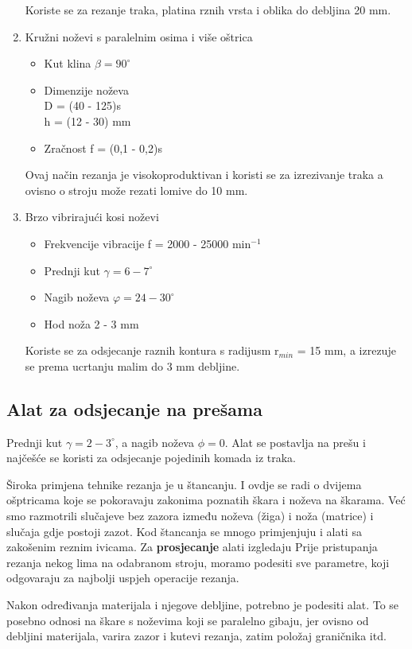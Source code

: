 \documentclass[a4paper,12pt]{article}
\numberwithin{figure}{section}
\begin{document}
\begin{enumerate}
\begin{itemize}
\end{itemize}
Koriste se za rezanje traka, platina rznih vrsta i oblika do debljina 20 mm.
\item Kružni noževi s paralelnim osima i više oštrica
\begin{itemize}
\item Kut klina $\beta = 90^{\circ}$
\item Dimenzije noževa \\
D = (40 - 125)s\\
h = (12 - 30) mm
\item Zračnost f = (0,1 - 0,2)s
\end{itemize}
Ovaj način rezanja je visokoproduktivan i koristi se za izrezivanje traka a ovisno o stroju može rezati lomive do 10 mm.
\item Brzo vibrirajući kosi noževi \\
\begin{itemize}
\item Frekvencije vibracije f = 2000 - 25000 min$^{-1}$
\item Prednji kut $\gamma = 6 -7^{\circ}$
\item Nagib noževa $\varphi = 24 - 30 ^{\circ}$
\item Hod noža 2 - 3 mm
\end{itemize}
Koriste se za odsjecanje raznih kontura s radijusm r$_{min}$ = 15 mm, a izrezuje se prema ucrtanju malim do 3 mm debljine.
\end{enumerate}
\subsection{Alat za odsjecanje na prešama}
Prednji kut $\gamma = 2 - 3^{\circ}$, a nagib noževa $\phi = 0$. Alat se postavlja na prešu i najčešće se koristi za odsjecanje pojedinih komada iz traka.\par
Široka primjena tehnike rezanja je u štancanju. I ovdje se radi o dvijema ošptricama koje se pokoravaju zakonima poznatih škara i noževa na škarama. Već smo razmotrili slučajeve bez zazora između noževa (žiga) i noža (matrice) i slučaja gdje postoji zazot. Kod štancanja se mnogo primjenjuju i alati sa zakošenim reznim ivicama. Za \textbf{prosjecanje} alati izgledaju 
Prije pristupanja rezanja nekog lima na odabranom stroju, moramo podesiti sve parametre, koji odgovaraju za najbolji uspjeh operacije rezanja. \par
Nakon određivanja materijala i njegove debljine, potrebno je podesiti alat. To se posebno odnosi na škare s noževima koji se paralelno gibaju, jer ovisno od debljini materijala, varira zazor i kutevi rezanja, zatim položaj graničnika itd.
\end{document}
